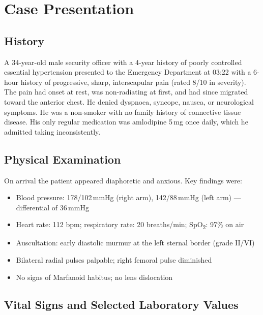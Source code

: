 \documentclass[11pt,a4paper]{article}
\begin{document}
\section{Case Presentation}

\subsection{History}

A 34-year-old male security officer with a 4-year history of poorly controlled essential
hypertension presented to the Emergency Department at 03:22 with a 6-hour history of
progressive, sharp, interscapular pain (rated 8/10 in severity). The pain had onset at rest,
was non-radiating at first, and had since migrated toward the anterior chest. He denied
dyspnoea, syncope, nausea, or neurological symptoms. He was a non-smoker with no family history
of connective tissue disease. His only regular medication was amlodipine 5\,mg once daily, which
he admitted taking inconsistently.

\subsection{Physical Examination}

On arrival the patient appeared diaphoretic and anxious. Key findings were:

\begin{itemize}
  \item Blood pressure: 178/102\,mmHg (right arm), 142/88\,mmHg (left arm) — differential of
        36\,mmHg
  \item Heart rate: 112 bpm; respiratory rate: 20 breaths/min; SpO\textsubscript{2}: 97\% on air
  \item Auscultation: early diastolic murmur at the left sternal border (grade II/VI)
  \item Bilateral radial pulses palpable; right femoral pulse diminished
  \item No signs of Marfanoid habitus; no lens dislocation
\end{itemize}

\subsection{Vital Signs and Selected Laboratory Values}
\end{document}
